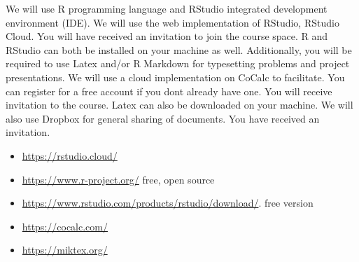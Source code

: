 
We will use R programming language and RStudio integrated development environment (IDE).  We will use the web implementation of RStudio, RStudio Cloud. You will have received an invitation to join the course space. R and RStudio can both be installed on your machine as well. Additionally, you will be required to use Latex and/or R Markdown for typesetting problems and project presentations. We will use a cloud implementation on CoCalc to facilitate. You can register for a free account if you dont already have one. You will receive invitation to the course. Latex can also be downloaded on your machine. We will also use Dropbox for general sharing of documents. You have received an invitation.
\begin{itemize}
\item \url{https://rstudio.cloud/}
\item \url{https://www.r-project.org/}  free, open source
\item \url{https://www.rstudio.com/products/rstudio/download/}. free version \
\item \url{https://cocalc.com/}
\item \url{https://miktex.org/}
\end{itemize}




